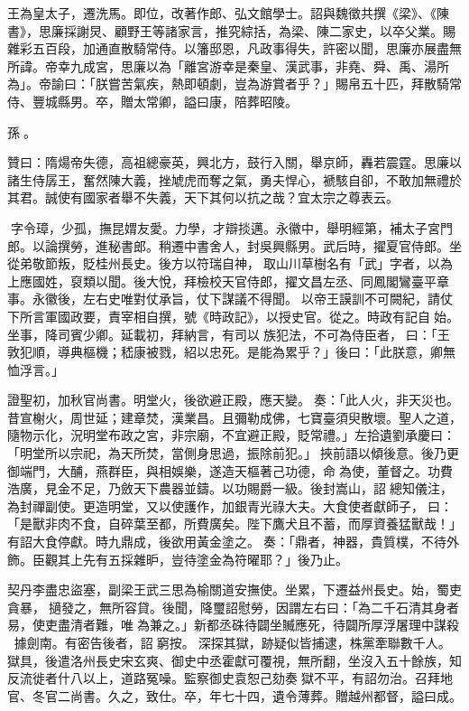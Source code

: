 \begin{pinyinscope}
 王為皇太子，遷洗馬。即位，改著作郎、弘文館學士。詔與魏徵共撰《梁》、《陳書》，思廉採謝炅、顧野王等諸家言，推究綜括，為梁、陳二家史，以卒父業。賜雜彩五百段，加通直散騎常侍。以籓邸恩，凡政事得失，許密以聞，思廉亦展盡無所諱。帝幸九成宮，思廉以為「離宮游幸是秦皇、漢武事，非堯、舜、禹、湯所為」。帝諭曰：「朕嘗苦氣疾，熱即頓劇，豈為游賞者乎？」賜帛五十匹，拜散騎常侍、豐城縣男。卒，贈太常卿，謚曰康，陪葬昭陵。



 孫。



 贊曰：隋煬帝失德，高祖總豪英，興北方，鼓行入關，舉京師，轟若震霆。思廉以諸生侍孱王，奮然陳大義，挫虓虎而奪之氣，勇夫悍心，褫駭自卻，不敢加無禮於其君。誠使有國家者舉不失義，天下其何以抗之哉？宜太宗之尊表云。



 字令璋，少孤，撫昆媦友愛。力學，才辯掞邁。永徽中，舉明經第，補太子宮門郎。以論撰勞，進秘書郎。稍遷中書舍人，封吳興縣男。武后時，擢夏官侍郎。坐從弟敬節叛，貶桂州長史。後方以符瑞自神，取山川草樹名有「武」字者，以為上應國姓，裒類以聞。後大悅，拜檢校天官侍郎，擢文昌左丞、同鳳閣鸞臺平章事。永徽後，左右史唯對仗承旨，仗下謀議不得聞。以帝王謨訓不可闕紀，請仗下所言軍國政要，責宰相自撰，號《時政記》，以授史官。從之。時政有記自始。坐事，降司賓少卿。延載初，拜納言，有司以族犯法，不可為侍臣者，曰：「王敦犯順，導典樞機；嵇康被戮，紹以忠死。是能為累乎？」後曰：「此朕意，卿無恤浮言。」



 證聖初，加秋官尚書。明堂火，後欲避正殿，應天變。奏：「此人火，非天災也。昔宣榭火，周世延；建章焚，漢業昌。且彌勒成佛，七寶臺須臾散壞。聖人之道，隨物示化，況明堂布政之宮，非宗廟，不宜避正殿，貶常禮。」左拾遺劉承慶曰：「明堂所以宗祀，為天所焚，當側身思過，振除前犯。」挾前語以傾後意。後乃更御端門，大酺，燕群臣，與相娛樂，遂造天樞著己功德，命為使，董督之。功費浩廣，見金不足，乃斂天下農器並鑄。以功賜爵一級。後封嵩山，詔總知儀注，為封禪副使。更造明堂，又以使護作，加銀青光祿大夫。大食使者獻師子，曰：「是獸非肉不食，自碎葉至都，所費廣矣。陛下鷹犬且不蓄，而厚資養猛獸哉！」有詔大食停獻。時九鼎成，後欲用黃金塗之。奏：「鼎者，神器，貴質樸，不待外飾。臣觀其上先有五採雜昈，豈待塗金為符曜耶？」後乃止。



 契丹李盡忠盜塞，副梁王武三思為榆關道安撫使。坐累，下遷益州長史。始，蜀吏貪暴，擿發之，無所容貸。後聞，降璽詔慰勞，因謂左右曰：「為二千石清其身者易，使吏盡清者難，唯為兼之。」新都丞硃待闢坐贓應死，待闢所厚浮屠理中謀殺，據劍南。有密告後者，詔窮按。深探其獄，跡疑似皆捕逮，株黨牽聯數千人。獄具，後遣洛州長史宋玄爽、御史中丞霍獻可覆視，無所翻，坐沒入五十餘族，知反流徙者什八以上，道路冤噪。監察御史袁恕己劾奏獄不平，有詔勿治。召拜地官、冬官二尚書。久之，致仕。卒，年七十四，遺令薄葬。贈越州都督，謚曰成。




\end{pinyinscope}
